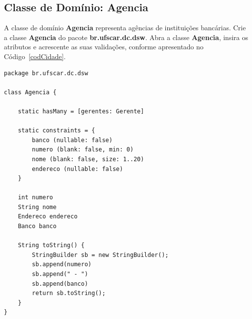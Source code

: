 \newpage

\subsection{Classe de Domínio: Agencia}\label{secAgencia}

\vspace{0.5cm}

A  classe   de  domínio  {\bf  Agencia}  representa   agências  de  instituições
bancárias. Crie a classe {\bf Agencia} do pacote {\bf br.ufscar.dc.dsw}.  Abra a
classe  {\bf Agencia},  insira os  atributos  e acrescente  as suas  validações,
conforme apresentado no Código~\ref{codCidade}. 

\begin{lstlisting}[caption=Classe  de  domínio  {\bf  Agencia},  frame  =  trBL,
    float=htbp, label=codAgencia] 
package br.ufscar.dc.dsw

class Agencia {

    static hasMany = [gerentes: Gerente]

    static constraints = {
        banco (nullable: false)
        numero (blank: false, min: 0)
        nome (blank: false, size: 1..20)
        endereco (nullable: false)
    }

    int numero
    String nome
    Endereco endereco
    Banco banco

    String toString() {
        StringBuilder sb = new StringBuilder();
        sb.append(numero)
        sb.append(" - ")
        sb.append(banco)
        return sb.toString();
    }
}
\end{lstlisting}

\vspace{0.3cm}
\hspace{1cm}\\

